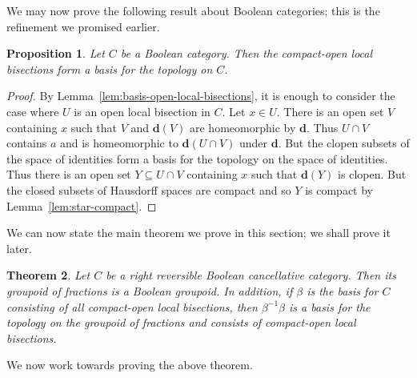 \documentclass[a4paper]{amsart}
\newtheorem{theorem}{Theorem}[section]
\newtheorem{proposition}[theorem]{Proposition}
\begin{document}
We may now prove the following result about Boolean categories; this is the refinement we promised earlier.

\begin{proposition}\label{prop:basis-etale} Let $C$ be a Boolean category.
Then the compact-open local bisections form a basis for the topology on $C$.
\end{proposition}
\begin{proof} By Lemma~\ref{lem:basis-open-local-bisections}, 
it is enough to consider the case where $U$ is an open local bisection in $C$.
Let $x \in U$.
There is an open set $V$ containing $x$ such that $V$ and $\mathbf{d}(V)$ are homeomorphic by $\mathbf{d}$.
Thus $U \cap V$ contains $a$ and is homeomorphic to $\mathbf{d}(U \cap V)$ under $\mathbf{d}$.
But the clopen subsets of the space of identities form a basis for the topology on the space of identities.
Thus there is an open set $Y \subseteq U \cap V$ containing $x$ such that $\mathbf{d}(Y)$ is clopen.
But the closed subsets of Hausdorff spaces are compact and so $Y$ is compact by Lemma~\ref{lem:star-compact}. 
\end{proof}

We can now state the main theorem we prove in this section;
we shall prove it later.

\begin{theorem}\label{them:stor} Let $C$ be a right reversible Boolean cancellative category.
Then its groupoid of fractions is a Boolean groupoid.
In addition, if $\beta$ is the basis for $C$ consisting of all compact-open local bisections,
then $\beta^{-1}\beta$ is a basis for the topology on the groupoid of fractions
and consists of compact-open local bisections.
\end{theorem}


We now work towards proving the above theorem.
\end{document}
